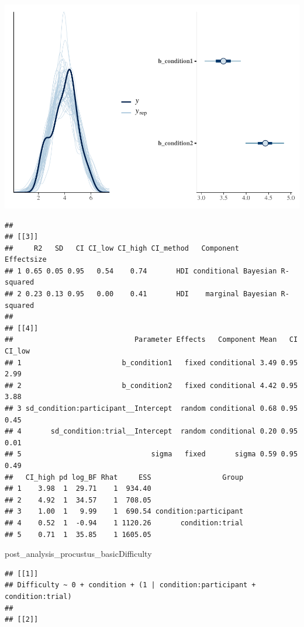 \documentclass[
]{article}
\newenvironment{Shaded}{\begin{snugshade}}{\end{snugshade}}
\newcommand{\NormalTok}[1]{#1}
\begin{document}
\includegraphics{06_Publish_GUSO_ASIL_files/figure-latex/DiagnosticsQ-3.pdf}

\begin{verbatim}
## 
## [[3]]
##     R2   SD   CI CI_low CI_high CI_method   Component         Effectsize
## 1 0.65 0.05 0.95   0.54    0.74       HDI conditional Bayesian R-squared
## 2 0.23 0.13 0.95   0.00    0.41       HDI    marginal Bayesian R-squared
## 
## [[4]]
##                             Parameter Effects   Component Mean   CI CI_low
## 1                        b_condition1   fixed conditional 3.49 0.95   2.99
## 2                        b_condition2   fixed conditional 4.42 0.95   3.88
## 3 sd_condition:participant__Intercept  random conditional 0.68 0.95   0.45
## 4       sd_condition:trial__Intercept  random conditional 0.20 0.95   0.01
## 5                               sigma   fixed       sigma 0.59 0.95   0.49
##   CI_high pd log_BF Rhat     ESS                 Group
## 1    3.98  1  29.71    1  934.40                      
## 2    4.92  1  34.57    1  708.05                      
## 3    1.00  1   9.99    1  690.54 condition:participant
## 4    0.52  1  -0.94    1 1120.26       condition:trial
## 5    0.71  1  35.85    1 1605.05
\end{verbatim}

\begin{Shaded}
\begin{Highlighting}[]
\NormalTok{post\_analysis\_procustus\_basicDifficulty}
\end{Highlighting}
\end{Shaded}

\begin{verbatim}
## [[1]]
## Difficulty ~ 0 + condition + (1 | condition:participant + condition:trial) 
## 
## [[2]]
\end{verbatim}
\end{document}
